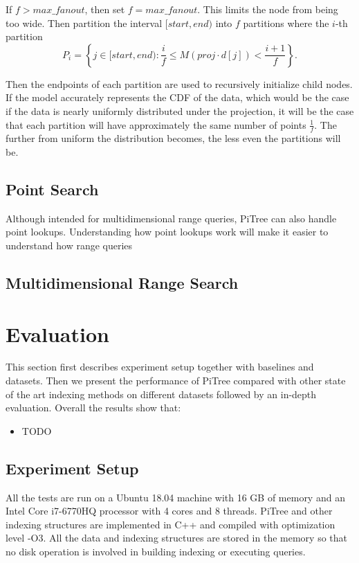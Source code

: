 \documentclass[sigconf,10pt]{acmart}
\begin{document}
If $f > max\_fanout$, then set $f = max\_fanout$. This limits
the node from being too wide.
Then partition the interval $[start, end)$ into $f$ partitions
where the $i$-th partition 
\[
  P_i = \left\{j \in [start, end): \frac{i}{f} \leq M(proj \cdot d[j]) < \frac{i+1}{f} \right\}.
\]

Then the endpoints of each partition are used to recursively initialize child nodes.
If the model accurately represents the CDF of the data, which would be the case
if the data is nearly uniformly distributed under the projection,
it will be the case that each partition will have approximately the same number of
points $\frac{1}{f}$. The further from uniform the distribution becomes,
the less even the partitions will be.


\subsection{Point Search}

Although intended for multidimensional range queries,
PiTree can also handle point lookups. Understanding how point lookups
work will make it easier to understand how range queries

\subsection{Multidimensional Range Search}

\section{Evaluation}

This section first describes experiment setup together with baselines and datasets. 
Then we present the performance of PiTree compared with other state of the art 
indexing methods on different datasets followed by an in-depth evaluation. 
Overall the results show that:
\begin{itemize}
    \item TODO
\end{itemize}

\subsection{Experiment Setup}

All the tests are run on a Ubuntu 18.04 machine with 16 GB of memory and an Intel 
Core i7-6770HQ processor with 4 cores and 8 threads. PiTree and other indexing 
structures are implemented in C++ and compiled with optimization level -O3. 
All the data and indexing structures are stored in the memory so that no disk 
operation is involved in building indexing or executing queries.
\end{document}
